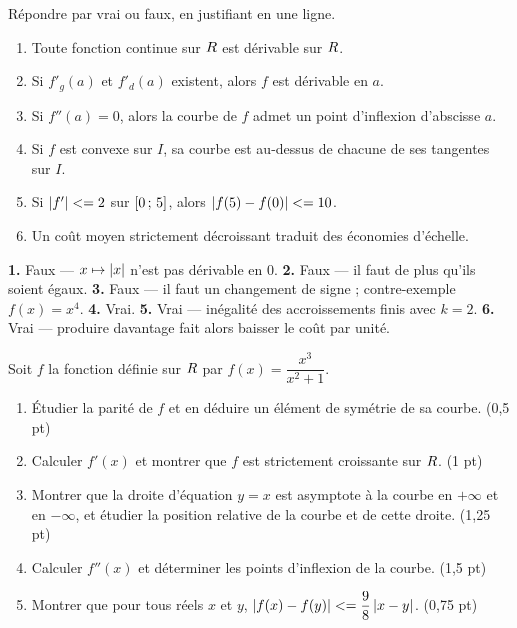 \begin{jemeteste}
Répondre par vrai ou faux, en justifiant en une ligne.

\begin{enumerate}[label=\textbf{\arabic*.}, leftmargin=*, itemsep=0.28em]
  \item Toute fonction continue sur $R$ est dérivable sur $R$.
  \item Si $f'_{g}(a)$ et $f'_{d}(a)$ existent, alors $f$ est dérivable en $a$.
  \item Si $f''(a) = 0$, alors la courbe de $f$ admet un point d'inflexion
        d'abscisse $a$.
  \item Si $f$ est convexe sur $I$, sa courbe est au-dessus de chacune de ses
        tangentes sur $I$.
  \item Si $\left|f'\right| <= 2$ sur $\left[0\,;\,5\right]$, alors
        $\left|f(5)-f(0)\right| <= 10$.
  \item Un coût moyen strictement décroissant traduit des économies
        d'échelle.
\end{enumerate}
\end{jemeteste}

\begin{corrige}[je me teste]
\textbf{1.} Faux — $x \mapsto \left|x\right|$ n'est pas dérivable en $0$.
\textbf{2.} Faux — il faut de plus qu'ils soient égaux.
\textbf{3.} Faux — il faut un changement de signe ; contre-exemple
$f(x) = x^{4}$.
\textbf{4.} Vrai.
\textbf{5.} Vrai — inégalité des accroissements finis avec $k = 2$.
\textbf{6.} Vrai — produire davantage fait alors baisser le coût par unité.
\end{corrige}

\begin{commeaubac}
Soit $f$ la fonction définie sur $R$ par $f(x) = \dfrac{x^{3}}{x^{2}+1}$.

\begin{enumerate}[label=\textbf{\arabic*.}, leftmargin=*, itemsep=0.25em]
  \item Étudier la parité de $f$ et en déduire un élément de symétrie de sa
        courbe. \hfill\textup{(0,5 pt)}
  \item Calculer $f'(x)$ et montrer que $f$ est strictement croissante
        sur $R$. \hfill\textup{(1 pt)}
  \item Montrer que la droite d'équation $y = x$ est asymptote à la courbe en
        $+\infty$ et en $-\infty$, et étudier la position relative de la
        courbe et de cette droite. \hfill\textup{(1,25 pt)}
  \item Calculer $f''(x)$ et déterminer les points d'inflexion de la courbe.
        \hfill\textup{(1,5 pt)}
  \item Montrer que pour tous réels $x$ et $y$,
        $\left|f(x)-f(y)\right| <= \dfrac{9}{8}\left|x-y\right|$.
        \hfill\textup{(0,75 pt)}
\end{enumerate}
\end{commeaubac}

